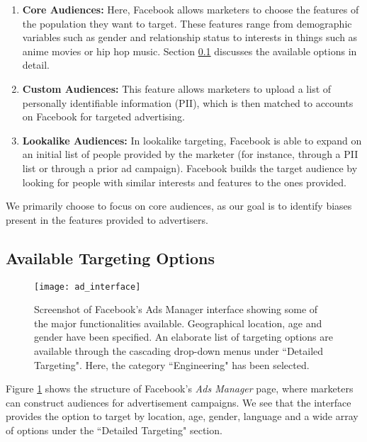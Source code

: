 \begin{enumerate}
\item \textbf{Core Audiences:} Here, Facebook allows marketers to choose the features of the population they want to target. These features range from demographic variables such as gender and relationship status to interests in things such as anime movies or hip hop music. Section \ref{subsec:targeting_options} discusses the available options in detail.

\item \textbf{Custom Audiences:} This feature allows marketers to upload a list of personally identifiable information (PII), which is then matched to accounts on Facebook for targeted advertising.

\item \textbf{Lookalike Audiences:} In lookalike targeting, Facebook is able to expand on an initial list of people provided by the marketer (for instance, through a PII list or through a prior ad campaign). Facebook builds the target audience by looking for people with similar interests and features to the ones provided.
\end{enumerate}

We primarily choose to focus on core audiences, as our goal is to identify biases present in the features provided to advertisers.

\subsection{Available Targeting Options} \label{subsec:targeting_options}

\begin{figure}

\centering
\texttt{[image: ad\_interface]}
\caption{Screenshot of Facebook's Ads Manager interface showing some of the major functionalities available. Geographical location, age and gender have been specified. An elaborate list of targeting options are available through the cascading drop-down menus under ``Detailed Targeting". Here, the category ``Engineering" has been selected.}
\label{fig:ad_interface}

\end{figure}

Figure \ref{fig:ad_interface} shows the structure of Facebook's \textit{Ads Manager} page, where marketers can construct audiences for advertisement campaigns. We see that the interface provides the option to target by location, age, gender, language and a wide array of options under the ``Detailed Targeting" section.

